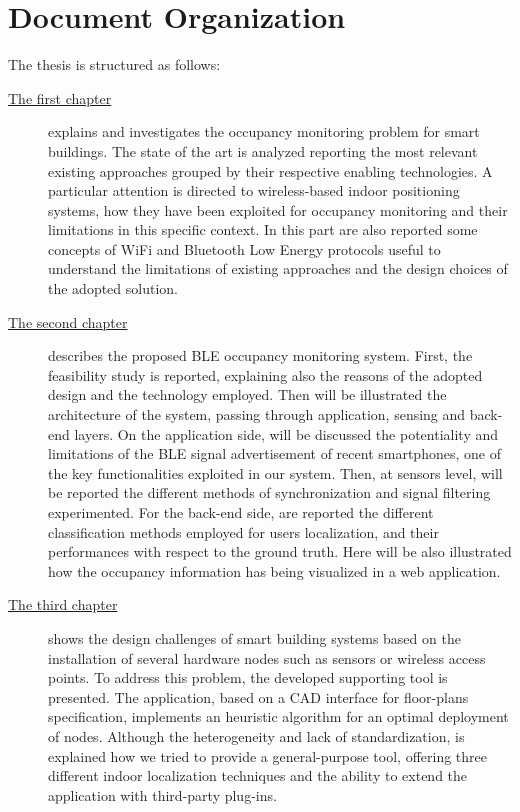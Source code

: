 \section{Document Organization}
%
\par The thesis is structured as follows:
%
%
\begin{description}
%
\item[{\hyperref[cap:soa]{The first chapter}}] explains and investigates the occupancy monitoring problem for smart buildings. The state of the art is analyzed reporting the most relevant existing approaches grouped by their respective enabling technologies. A particular attention is directed to wireless-based indoor positioning systems, how they have been exploited for occupancy monitoring and their limitations in this specific context. In this part are also reported some concepts of WiFi and Bluetooth Low Energy protocols useful to understand the limitations of existing approaches and the design choices of the adopted solution.
%
\item[{\hyperref[cap:bluesentinel]{The second chapter}}] describes the proposed BLE occupancy monitoring system. First, the feasibility study is reported, explaining also the reasons of the adopted design and the technology employed. Then will be illustrated the architecture of the system, passing through application, sensing and back-end layers. On the application side, will be discussed the potentiality and limitations of the BLE signal advertisement of recent smartphones, one of the key functionalities exploited in our system. Then, at sensors level, will be reported the different methods of synchronization and signal filtering experimented. For the back-end side, are reported the different classification methods employed for users localization, and their performances with respect to the ground truth. Here will be also illustrated how the occupancy information has being visualized in a web application.
%
\item[{\hyperref[cap:cad]{The third chapter}}] shows the design challenges of smart building systems based on the installation of several hardware nodes such as sensors or wireless access points. To address this problem, the developed supporting tool is presented. The application, based on a CAD interface for floor-plans specification, implements an heuristic algorithm for an optimal deployment of nodes. Although the heterogeneity and lack of standardization, is explained how we tried to provide a general-purpose tool, offering three different indoor localization techniques and the ability to extend the application with third-party plug-ins.

\end{description}

